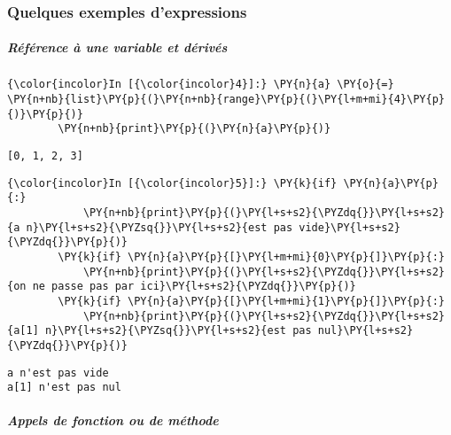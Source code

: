     \hypertarget{quelques-exemples-dexpressions}{%
\subsubsection{Quelques exemples
d'expressions}\label{quelques-exemples-dexpressions}}

    \hypertarget{ruxe9fuxe9rence-uxe0-une-variable-et-duxe9rivuxe9s}{%
\subparagraph{Référence à une variable et
dérivés}\label{ruxe9fuxe9rence-uxe0-une-variable-et-duxe9rivuxe9s}}

    \begin{Verbatim}[commandchars=\\\{\},frame=single,framerule=0.3mm,rulecolor=\color{cellframecolor}]
{\color{incolor}In [{\color{incolor}4}]:} \PY{n}{a} \PY{o}{=} \PY{n+nb}{list}\PY{p}{(}\PY{n+nb}{range}\PY{p}{(}\PY{l+m+mi}{4}\PY{p}{)}\PY{p}{)}
        \PY{n+nb}{print}\PY{p}{(}\PY{n}{a}\PY{p}{)}
\end{Verbatim}


    \begin{Verbatim}[commandchars=\\\{\},frame=single,framerule=0.3mm,rulecolor=\color{cellframecolor}]
[0, 1, 2, 3]
\end{Verbatim}

    \begin{Verbatim}[commandchars=\\\{\},frame=single,framerule=0.3mm,rulecolor=\color{cellframecolor}]
{\color{incolor}In [{\color{incolor}5}]:} \PY{k}{if} \PY{n}{a}\PY{p}{:}
            \PY{n+nb}{print}\PY{p}{(}\PY{l+s+s2}{\PYZdq{}}\PY{l+s+s2}{a n}\PY{l+s+s2}{\PYZsq{}}\PY{l+s+s2}{est pas vide}\PY{l+s+s2}{\PYZdq{}}\PY{p}{)}
        \PY{k}{if} \PY{n}{a}\PY{p}{[}\PY{l+m+mi}{0}\PY{p}{]}\PY{p}{:}
            \PY{n+nb}{print}\PY{p}{(}\PY{l+s+s2}{\PYZdq{}}\PY{l+s+s2}{on ne passe pas par ici}\PY{l+s+s2}{\PYZdq{}}\PY{p}{)}
        \PY{k}{if} \PY{n}{a}\PY{p}{[}\PY{l+m+mi}{1}\PY{p}{]}\PY{p}{:}
            \PY{n+nb}{print}\PY{p}{(}\PY{l+s+s2}{\PYZdq{}}\PY{l+s+s2}{a[1] n}\PY{l+s+s2}{\PYZsq{}}\PY{l+s+s2}{est pas nul}\PY{l+s+s2}{\PYZdq{}}\PY{p}{)}
\end{Verbatim}


    \begin{Verbatim}[commandchars=\\\{\},frame=single,framerule=0.3mm,rulecolor=\color{cellframecolor}]
a n'est pas vide
a[1] n'est pas nul
\end{Verbatim}

    \hypertarget{appels-de-fonction-ou-de-muxe9thode}{%
\subparagraph{Appels de fonction ou de
méthode}\label{appels-de-fonction-ou-de-muxe9thode}}

